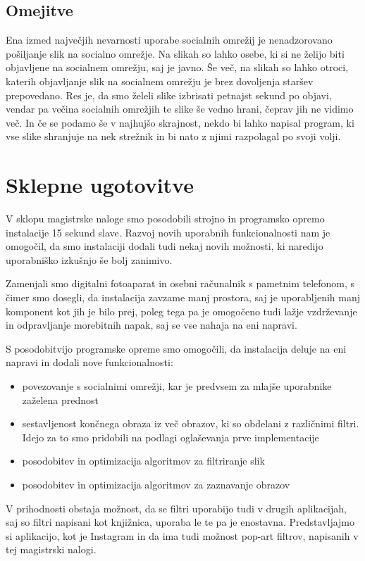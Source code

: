 \section{Omejitve}
Ena izmed največjih nevarnosti uporabe socialnih omrežij je nenadzorovano
pošiljanje slik na socialno omrežje. Na slikah so lahko osebe, ki si ne želijo
biti objavljene na socialnem omrežju, saj je javno. Še več, na slikah so lahko
otroci, katerih objavljanje slik na socialnem omrežju je brez dovoljenja
staršev prepovedano. Res je, da smo želeli slike izbrisati petnajst sekund po
objavi, vendar pa večina socialnih omrežjih te slike še vedno hrani, čeprav
jih ne vidimo več. In če se podamo še v najhujšo skrajnost, nekdo bi lahko
napisal program, ki vse slike shranjuje na nek strežnik in bi nato z njimi
razpolagal po svoji volji.


\chapter{Sklepne ugotovitve}
V sklopu magistrske naloge smo posodobili strojno in programsko opremo
instalacije 15 sekund slave. Razvoj novih uporabnih funkcionalnosti nam je
omogočil, da smo instalaciji dodali tudi nekaj novih možnosti, ki naredijo
uporabniško izkušnjo še bolj zanimivo.

Zamenjali smo digitalni fotoaparat in osebni računalnik s pametnim telefonom,
s čimer smo dosegli, da instalacija zavzame manj prostora, saj je uporabljenih
manj komponent kot jih je bilo prej, poleg tega pa je omogočeno tudi lažje
vzdrževanje in odpravljanje morebitnih napak, saj se vse nahaja na eni
napravi.

S posodobitvijo programske opreme smo omogočili, da instalacija deluje na eni
napravi in dodali nove funkcionalnosti:
\begin{itemize}
	\item povezovanje s socialnimi omrežji, kar je predvsem za mlajše uporabnike zaželena prednost
	\item sestavljenost končnega obraza iz več obrazov, ki so obdelani z različnimi filtri. Idejo za to smo pridobili na podlagi oglaševanja prve implementacije
	\item posodobitev in optimizacija algoritmov za filtriranje slik
	\item posodobitev in optimizacija algoritmov za zaznavanje obrazov
\end{itemize}

V prihodnosti obstaja možnost, da se filtri uporabijo tudi v drugih
aplikacijah, saj so filtri napisani kot knjižnica, uporaba le te pa je
enostavna. Predstavljajmo si aplikacijo, kot je Instagram in da ima tudi
možnost pop-art filtrov, napisanih v tej magistrski nalogi.


